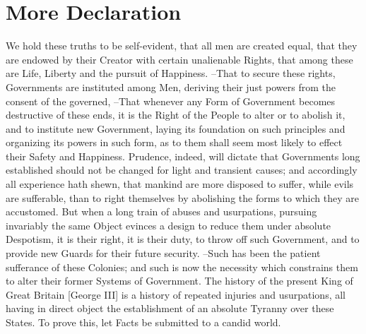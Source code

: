 \section{More Declaration}

We hold these truths to be self-evident, that all men are created equal,  that they are endowed by their Creator with certain unalienable Rights,  that among these are Life, Liberty and the pursuit of Happiness. --That to secure these  rights, Governments are instituted among Men, deriving their just powers  from the consent of the governed, --That whenever any Form of Government  becomes destructive of these ends, it is the Right of the People to alter  or to abolish it, and to institute new Government, laying its foundation on  such principles and organizing its powers in such form, as to them shall  seem most likely to effect their Safety and Happiness. Prudence, indeed, will dictate that Governments long established should not  be changed for light and transient causes; and accordingly all experience  hath shewn, that mankind are more disposed to suffer, while evils are  sufferable, than to right themselves by abolishing the forms to which they  are accustomed. But when a long train of abuses and usurpations, pursuing invariably the same  Object evinces a design to reduce them under absolute Despotism, it is their  right, it is their duty, to throw off such Government, and to provide new Guards for their future security. --Such has been the patient sufferance of these Colonies; and such is now the  necessity which constrains them to alter their former Systems of Government.  The history of the present King of Great Britain [George III] is a history  of repeated injuries and usurpations, all having in direct object the  establishment of an absolute Tyranny over these States. To prove this, let Facts be submitted to a candid world.